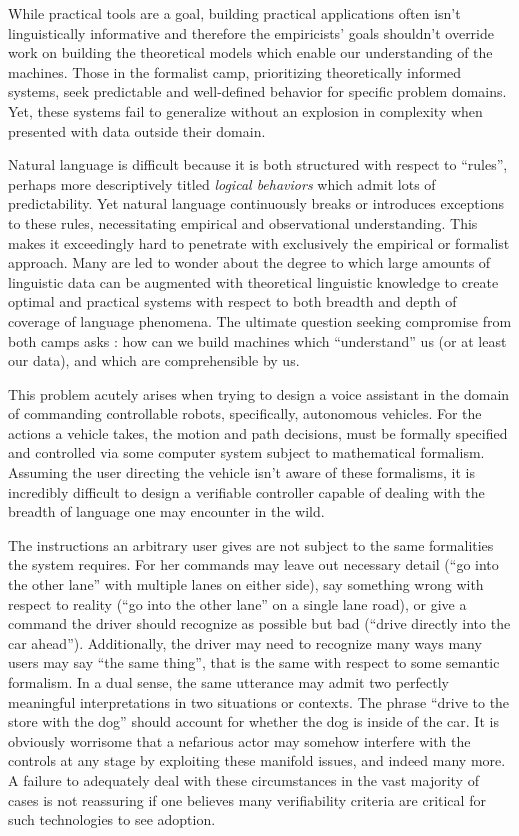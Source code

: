\documentclass{article}
\begin{document}
While practical tools are a goal, building practical applications often isn't
linguistically informative and therefore the empiricists' goals shouldn't
override work on building the theoretical models which enable our understanding
of the machines. Those in the formalist camp, prioritizing theoretically
informed systems, seek predictable and well-defined behavior for specific
problem domains. Yet, these systems fail to generalize without an explosion in
complexity when presented with data outside their domain.

Natural language is difficult because it is both structured with respect to
``rules'', perhaps more descriptively titled \emph{logical behaviors} which
admit lots of predictability. Yet natural language continuously breaks or
introduces exceptions to these rules, necessitating empirical and observational
understanding. This makes it exceedingly hard to penetrate with exclusively the
empirical or formalist approach. Many are led to wonder about the degree to
which large amounts of linguistic data can be augmented with theoretical
linguistic knowledge to create optimal and practical systems with respect to
both breadth and depth of coverage of language phenomena. The ultimate question
seeking compromise from both camps asks : how can we build machines which
``understand'' us (or at least our data), and which are comprehensible by us.

This problem acutely arises when trying to design a voice assistant in the
domain of commanding controllable robots, specifically, autonomous vehicles. For
the actions a vehicle takes, the motion and path decisions, must be formally
specified and controlled via some computer system subject to mathematical
formalism. Assuming the user directing the vehicle isn't aware of these
formalisms, it is incredibly difficult to design a verifiable controller capable
of dealing with the breadth of language one may encounter in the wild.

The instructions an arbitrary user gives are not subject to the same formalities
the system requires. For her commands may leave out necessary detail (``go into
the other lane'' with multiple lanes on either side), say something wrong with
respect to reality (``go into the other lane'' on a single lane road), or give a
command the driver should recognize as possible but bad (``drive directly
into the car ahead''). Additionally, the driver may need to recognize many
ways many users may say ``the same thing'', that is the same with respect to
some semantic formalism. In a dual sense, the same utterance may admit two
perfectly meaningful interpretations in two situations or contexts. The phrase
``drive to the store with the dog'' should account for whether the dog is inside
of the car. It is obviously worrisome that a nefarious actor may somehow
interfere with the controls at any stage by exploiting these manifold issues,
and indeed many more. A failure to adequately deal with these circumstances in the
vast majority of cases is not reassuring if one believes many verifiability
criteria are critical for such technologies to see adoption.
\end{document}
